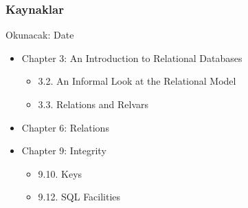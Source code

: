 \documentclass[dvipsnames]{beamer}
\theoremstyle{definition}
\theoremstyle{example}
\theoremstyle{plain}
\begin{document}
\begin{frame}
  \frametitle{Kaynaklar}

  \begin{block}{Okunacak: Date}
    \begin{itemize}
      \item Chapter 3: An Introduction to Relational Databases
      \begin{itemize}
        \item 3.2. \alert{An Informal Look at the Relational Model}
        \item 3.3. \alert{Relations and Relvars}
      \end{itemize}

      \item Chapter 6: \alert{Relations}

      \item Chapter 9: Integrity
      \begin{itemize}
        \item 9.10. \alert{Keys}
        \item 9.12. \alert{SQL Facilities}
      \end{itemize}
    \end{itemize}
  \end{block}
\end{frame}
\end{document}
